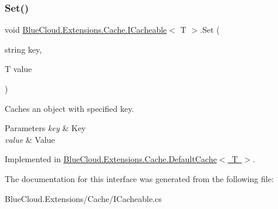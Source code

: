 \subsubsection{\texorpdfstring{Set()}{Set()}}
{\footnotesize\ttfamily void \mbox{\hyperlink{interface_blue_cloud_1_1_extensions_1_1_cache_1_1_i_cacheable}{Blue\+Cloud.\+Extensions.\+Cache.\+I\+Cacheable}}$<$ T $>$.Set (\begin{DoxyParamCaption}\item[{string}]{key,  }\item[{T}]{value }\end{DoxyParamCaption})}



Caches an object with specified key. 


\begin{DoxyParams}{Parameters}
{\em key} & Key\\
\hline
{\em value} & Value\\
\hline
\end{DoxyParams}


Implemented in \mbox{\hyperlink{class_blue_cloud_1_1_extensions_1_1_cache_1_1_default_cache_a516484e43036468f7258451139938798}{Blue\+Cloud.\+Extensions.\+Cache.\+Default\+Cache$<$ T $>$}}.



The documentation for this interface was generated from the following file\+:\begin{DoxyCompactItemize}
\item 
Blue\+Cloud.\+Extensions/\+Cache/I\+Cacheable.\+cs\end{DoxyCompactItemize}

